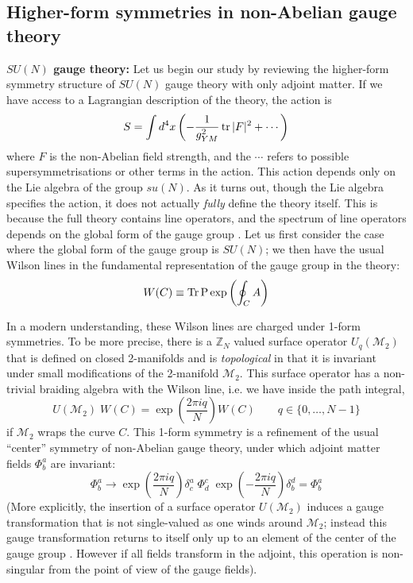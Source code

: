 \documentclass[aps,preprint,nofootinbib,preprintnumbers,eqsecnum,superscriptaddress]{revtex4}
\newcommand \tr {\mbox{{\bf Tr}}}
\def\Tr{\mathop{\rm Tr}}
\def\tr{\mathop{\rm tr}}
\def\le{\left}
\def\ri{\right}
\newcommand\sM{{\ensuremath{{\mathcal M}}}}
\begin{document}
\subsection{Higher-form symmetries in non-Abelian gauge theory}
{\bf $SU(N)$ gauge theory:} Let us begin our study by reviewing the higher-form symmetry structure of $SU(N)$ gauge theory with only adjoint matter. If we have access to a Lagrangian description of the theory, the action is
\begin{equation}
S = \int d^4x \le(- \frac{1}{g_{YM}^2} \tr |F|^2 + \cdots \ri) \label{gaugeac} 
\end{equation}
where $F$ is the non-Abelian field strength, and the $\cdots$ refers to possible supersymmetrisations or other terms in the action. This action depends only on the Lie algebra of the group $su(N)$. As it turns out, though the Lie algebra specifies the action, it does not actually {\it fully} define the theory itself. This is because the full theory contains line operators, and the spectrum of line operators depends on the global form of the gauge group \cite{Aharony:2013hda}. Let us first consider the case where the global form of the gauge group is $SU(N)$; we then have the usual Wilson lines in the fundamental representation of the gauge group in the theory:
\begin{equation}
W(C) \equiv \Tr\mathrm{P} \exp\le(\oint_{C} A\ri)
\end{equation}

In a modern understanding, these Wilson lines are charged under 1-form symmetries. To be more precise, there is a $\mathbb{Z}_N$ valued surface operator $U_{q}(\sM_2)$ that is defined on closed 2-manifolds and is {\it topological} in that it is invariant under small modifications of the 2-manifold $\sM_2$. This surface operator has a non-trivial braiding algebra with the Wilson line, i.e. we have inside the path integral,
\begin{equation}
U(\sM_2) \; W(C)  = \exp\le(\frac{2 \pi i q}{N}\ri) W(C) \qquad q \in \{0,\ldots,N-1\}
\end{equation}
if $\sM_2$ wraps the curve $C$. This 1-form symmetry is a refinement of the usual ``center'' symmetry of non-Abelian gauge theory, under which adjoint matter fields $\Phi^a_b$ are invariant:
\begin{equation}
	\Phi^a_b \to \exp\left(\frac{2 \pi i q}{N}\right) \delta^a_c \; \Phi^c_d \; \exp\left(-\frac{2 \pi i q}{N}\right) \delta^d_b = \Phi^a_b
\end{equation}
(More explicitly, the insertion of a surface operator $U(\sM_2)$ induces a gauge transformation that is not single-valued as one winds around $\sM_2$; instead this gauge transformation returns to itself only up to an element of the center of the gauge group \cite{tHooft:1977nqb}. However if all fields transform in the adjoint, this operation is non-singular from the point of view of the gauge fields). 
\end{document}

